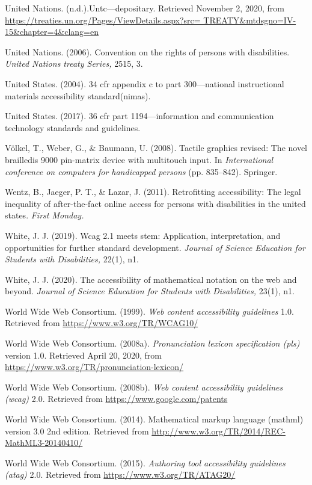 \documentclass{sig-alternate} %
\begin{document}
United Nations. (n.d.).Untc—depositary. Retrieved November 2, 2020, from \url{https://treaties.un.org/Pages/ViewDetails.aspx?src= TREATY&mtdsgno=IV-15&chapter=4&clang=en}

United Nations. (2006). Convention on the rights of persons with disabilities. \textit{United Nations treaty Series,} 2515, 3.

United States. (2004). 34 cfr appendix c to part 300—national instructional materials accessibility standard(nimas).

United States. (2017). 36 cfr part 1194—information and communication technology standards and guidelines.

Völkel, T., Weber, G., \& Baumann, U. (2008). Tactile graphics revised: The novel brailledis 9000 pin-matrix device with multitouch input. In \textit{International conference on computers for handicapped persons} (pp. 835–842). Springer.

Wentz, B., Jaeger, P. T., \& Lazar, J. (2011). Retrofitting accessibility: The legal inequality of after-the-fact online access for persons with disabilities in the united states. \textit{First Monday.}

White, J. J. (2019). Wcag 2.1 meets stem: Application, interpretation, and opportunities for further standard development. \textit{Journal of Science Education for Students with Disabilities,} 22(1), n1.

White, J. J. (2020). The accessibility of mathematical notation on the web and beyond. \textit{Journal of Science Education for Students with Disabilities,} 23(1), n1.

World Wide Web Consortium. (1999). \textit{Web content accessibility guidelines} 1.0. Retrieved from \url{https://www.w3.org/TR/WCAG10/}

World Wide Web Consortium. (2008a). \textit{Pronunciation lexicon specification (pls)} version 1.0. Retrieved April 20, 2020, from \url{https://www.w3.org/TR/pronunciation-lexicon/}

World Wide Web Consortium. (2008b). \textit{Web content accessibility guidelines (wcag)} 2.0. Retrieved from \url{https://www.google.com/patents}

World Wide Web Consortium. (2014). Mathematical markup language (mathml) version 3.0 2nd edition.
Retrieved from \url{http://www.w3.org/TR/2014/REC-MathML3-20140410/} %

World Wide Web Consortium. (2015). \textit{Authoring tool accessibility guidelines (atag)} 2.0. Retrieved from \url{https://www.w3.org/TR/ATAG20/}
\end{document}

